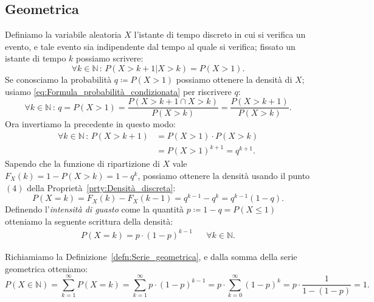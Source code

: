         \subsection{Geometrica}
            \begin{defn}
                Definiamo la variabile aleatoria $X$ l'istante di tempo discreto in cui si verifica un evento, e tale evento sia indipendente dal tempo al quale si verifica; fissato un istante di tempo $k$ possiamo scrivere: \[
                    \forall k \in \mathbb{N} \,:\, P(X > k + 1 | X > k) = P(X > 1)
                .\] Se conosciamo la probabilità $q \coloneqq P(X > 1)$ possiamo ottenere la densità di $X$; usiamo \eqref{eq:Formula_probabilità_condizionata} per riscrivere $q$: \[
                    \forall k \in \mathbb{N} \,:\, q = P(X > 1) = \frac{P(X > k + 1 \cap X > k)}{P(X > k)} = \frac{P(X > k + 1)}{P(X > k)}
                .\] Ora invertiamo la precedente in questo modo:
                \begin{align*}
                    \forall k \in \mathbb{N} \,:\, P(X > k + 1) &= P(X > 1) \cdot P(X > k) \\
                                                        &= P(X > 1)^{k+1} = q^{k+1}
                .\end{align*}
                Sapendo che la funzione di ripartizione di $X$ vale $F_X(k) = 1 - P(X > k) = 1 - q^k$, possiamo ottenere la densità usando il punto $(4)$ della Proprietà~\ref{prty:Densità_discreta}: \[
                    P(X = k) = F_X(k) - F_X(k-1) = q^{k-1} - q^k = q^{k-1}(1-q)
                .\] Definendo l'\textit{intensità di guasto} come la quantità $p \coloneqq 1-q = P(X \leq 1)$ otteniamo la seguente scrittura della densità:
                \begin{align*}
                    P(X = k) = p \cdot (1-p)^{k-1} & &\forall k \in \mathbb{N}
                .\end{align*}
            \end{defn}
            \begin{obsv}
                Richiamiamo la Definizione~\ref{defn:Serie_geometrica}, e dalla somma della serie geometrica otteniamo: \[
                    P(X \in \mathbb{N}) = \sum_{k=1}^{\infty} P(X = k) = \sum_{k=1}^{\infty} p \cdot (1-p)^{k-1} = p \cdot \sum_{k=0}^{\infty} (1-p)^k = p \cdot \frac{1}{1-(1-p)} = 1
                .\] 
            \end{obsv}
